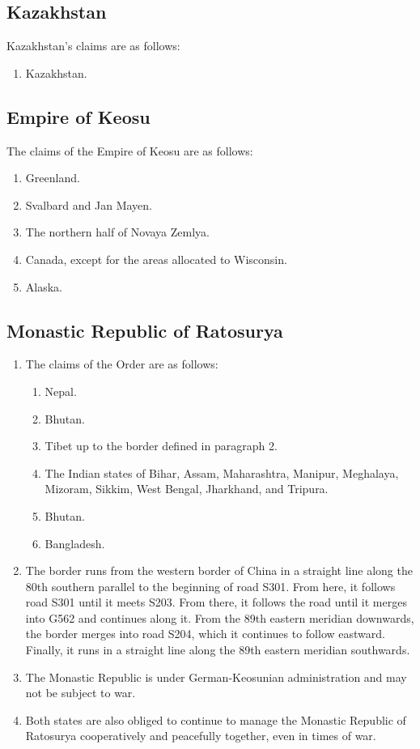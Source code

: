 \documentclass{article}
\begin{document}
\subsection{Kazakhstan}
Kazakhstan's claims are as follows:
\begin{enumerate}
    \item Kazakhstan.
\end{enumerate}

\subsection{Empire of Keosu}
The claims of the Empire of Keosu are as follows:
\begin{enumerate}
    \item Greenland.
    \item Svalbard and Jan Mayen.
    \item The northern half of Novaya Zemlya.
    \item Canada, except for the areas allocated to Wisconsin.
    \item Alaska.
\end{enumerate}

\subsection{Monastic Republic of Ratosurya}\label{order}
\begin{enumerate}[(1)]
    \item The claims of the Order are as follows:
    \begin{enumerate}[1.]
        \item Nepal.
        \item Bhutan.
        \item Tibet up to the border defined in paragraph 2.
        \item The Indian states of Bihar, Assam, Maharashtra, Manipur, Meghalaya, Mizoram, Sikkim, West Bengal, Jharkhand, and Tripura.
        \item Bhutan.
        \item Bangladesh.
    \end{enumerate}
    \item The border runs from the western border of China in a straight line along the 80th southern parallel to the beginning of road S301. From here, it follows road S301 until it meets S203. From there, it follows the road until it merges into G562 and continues along it. From the 89th eastern meridian downwards, the border merges into road S204, which it continues to follow eastward. Finally, it runs in a straight line along the 89th eastern meridian southwards.
    \item The Monastic Republic is under German-Keosunian administration and may not be subject to war.
    \item Both states are also obliged to continue to manage the Monastic Republic of Ratosurya cooperatively and peacefully together, even in times of war.
\end{enumerate}
\end{document}
